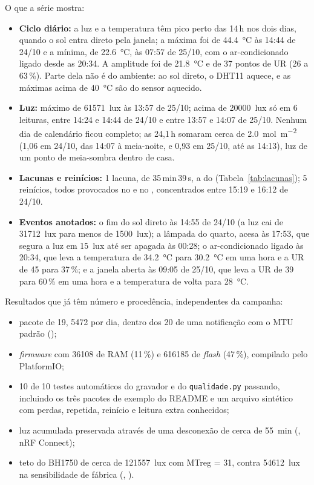 \noindent O que a série mostra:
\begin{itemize}
  \item \textbf{Ciclo diário:} a luz e a temperatura têm pico perto das 14\,h
    nos dois dias, quando o sol entra direto pela janela; a máxima foi de
    \SI{44.4}{\celsius} às 14:44 de 24/10 e a mínima, de
    \SI{22.6}{\celsius}, às 07:57 de 25/10, com o ar-condicionado ligado
    desde as 20:34. A amplitude foi de \SI{21.8}{\celsius} e de 37 pontos
    de UR (26 a 63\,\%). Parte dela não é do ambiente: ao sol direto, o
    DHT11 aquece, e as máximas acima de \SI{40}{\celsius} são do sensor
    aquecido.
  \item \textbf{Luz:} máximo de \SI{61571}{lux} às 13:57 de 25/10; acima de
    \SI{20000}{lux} só em 6 leituras, entre 14:24 e 14:44 de 24/10 e
    entre 13:57 e 14:07 de 25/10. Nenhum dia de calendário ficou
    completo; as 24,1\,h somaram cerca de \SI{2.0}{\mol\per\square\metre}
    (1,06 em 24/10, das 14:07 à meia-noite, e 0,93 em 25/10, até as
    14:13), luz de um ponto de meia-sombra dentro de casa.
  \item \textbf{Lacunas e reinícios:} 1 lacuna, de 35\,min\,39\,s, a do
     (Tabela~\ref{tab:lacunas}); 5 reinícios, todos provocados no
     e no , concentrados entre 15:19 e 16:12 de 24/10.
  \item \textbf{Eventos anotados:} o fim do sol direto às 14:55 de 24/10
    (a luz cai de \SI{31712}{lux} para menos de \SI{1500}{lux}); a lâmpada
    do quarto, acesa às 17:53, que segura a luz em \SI{15}{lux} até ser
    apagada às 00:28; o ar-condicionado ligado às 20:34, que leva a
    temperatura de \SI{34.2}{\celsius} para \SI{30.2}{\celsius} em uma hora
    e a UR de 45 para 37\,\%; e a janela aberta às 09:05 de 25/10, que
    leva a UR de 39 para 60\,\% em uma hora e a temperatura de volta para
    \SI{28}{\celsius}.
\end{itemize}

\noindent Resultados que já têm número e procedência, independentes da
campanha:
\begin{itemize}
  \item pacote de \SI{19}{\byte}, \SI{5472}{\byte} por dia, dentro dos
    \SI{20}{\byte} de uma notificação com o MTU padrão ();
  \item \emph{firmware} com \SI{36108}{\byte} de RAM (11\,\%) e
    \SI{616185}{\byte} de \emph{flash} (47\,\%), compilado pelo PlatformIO;
  \item 10 de 10 testes automáticos do gravador e do \texttt{qualidade.py}
    passando, incluindo os três pacotes de exemplo do README e um arquivo
    sintético com perdas, repetida, reinício e leitura extra conhecidos;
  \item luz acumulada preservada através de uma desconexão de cerca de
    \SI{55}{\minute} (, nRF Connect);
  \item teto do BH1750 de cerca de \SI{121557}{lux} com MTreg = 31, contra
    \SI{54612}{lux} na sensibilidade de fábrica (, \folhadedados).
\end{itemize}

